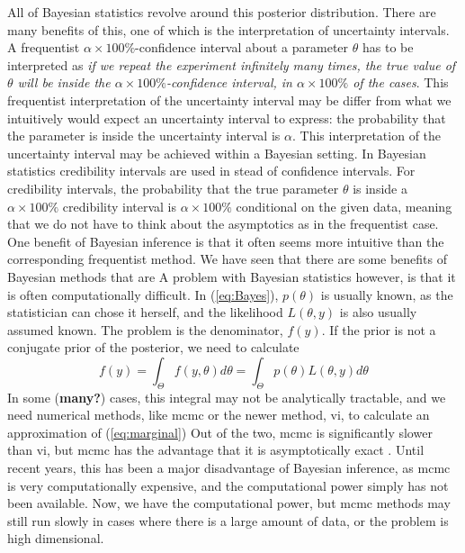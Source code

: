 \documentclass{article}
\theoremstyle{definition}
\begin{document}
All of Bayesian statistics revolve around this posterior distribution. 
There are many benefits of this, one of which is the interpretation of uncertainty intervals. 
A frequentist $\alpha \times 100\%$-confidence interval about a parameter $\theta$ has to be interpreted as \textit{if we repeat the experiment infinitely many times, the true value of $\theta$ will be inside the $\alpha\times 100\%$-confidence interval, in $\alpha\times 100\%$ of the cases}. This frequentist interpretation of the uncertainty interval may be differ from what we intuitively would expect an uncertainty interval to express: the probability that the parameter is inside the uncertainty interval is $\alpha$. This interpretation of the uncertainty interval may be achieved within a Bayesian setting. In Bayesian statistics credibility intervals are used in stead of confidence intervals. For credibility intervals, the probability that the true parameter $\theta$ is inside a $\alpha\times 100\%$ credibility interval is $\alpha\times 100\%$ conditional on the given data, meaning that we do not have to think about the asymptotics as in the frequentist case.  One benefit of Bayesian inference is that it often seems more intuitive than the corresponding frequentist method. 
We have seen that there are some benefits of Bayesian methods that are 
A problem with Bayesian statistics however, is that it is often computationally difficult. In (\ref{eq:Bayes}), $p\left(\theta\right)$ is usually known, as the statistician can chose it herself, and the likelihood $L\left(\theta, y\right)$ is also usually assumed known. The problem is the denominator, $f\left(y\right)$. If the prior is not a conjugate prior of the posterior, we need to calculate 
\begin{equation}\label{eq:marginal}
    f\left(y\right) = \int_{\Theta}f\left(y,\theta\right) d\theta = \int_{\Theta} p\left(\theta\right)L\left(\theta, y\right) d\theta
\end{equation}
In some (\textbf{many?}) cases, this integral may not be analytically tractable, and we need numerical methods, like \gls{mcmc} or the newer method, \gls{vi}, to calculate an approximation of (\ref{eq:marginal}) Out of the two, \gls{mcmc} is significantly slower than \gls{vi}, but \gls{mcmc} has the advantage that it is asymptotically exact \cite{vi}.
Until recent years, this has been a major disadvantage of Bayesian inference, as \gls{mcmc} is very computationally expensive, and the computational power simply has not been available.  Now, we have the computational power, but \gls{mcmc} methods may still run slowly in cases where there is a large amount of data, or the problem is high dimensional. 
\end{document}
